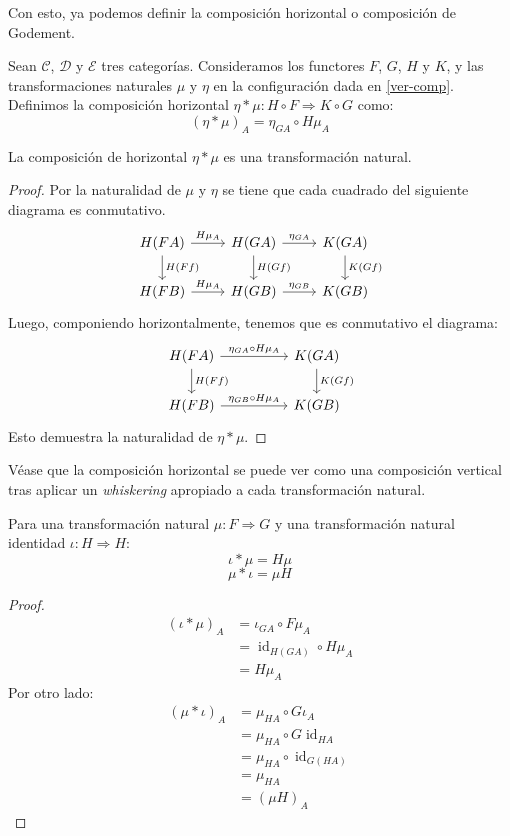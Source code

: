 \documentclass[12pt, twoside]{book}
\newcommand{\cat}{{\mathcal{C}}}
\DeclareMathOperator{\id}{id}
\begin{document}
Con esto, ya podemos definir la composición horizontal o composición de Godement.
\begin{definition}
Sean $\cat$, $\mathcal{D}$ y $\mathcal{E}$ tres categorías.
Consideramos los functores $F$, $G$, $H$ y $K$, y las transformaciones naturales $\mu$ y $\eta$ en la configuración dada en \ref{ver-comp}.
Definimos la composición horizontal $\eta * \mu \colon H \circ F \Rightarrow K \circ G$ como:
\[ (\eta * \mu)_A = \eta_{G A} \circ H\mu_A \]
\end{definition}
\begin{proposition}
La composición de horizontal $\eta * \mu$ es una transformación natural.
\end{proposition}
\begin{proof}
Por la naturalidad de $\mu$ y $\eta$ se tiene que cada cuadrado del siguiente diagrama es conmutativo.
\[\begin{tikzcd}
{H(F A)} \arrow[r,"H\mu_A"] \arrow[d,"H(F f)"] & {H(G A)} \arrow[r,"\eta_{G A}"] \arrow[d,"H(G f)"] & {K(G A)} \arrow[d,"K(G f)"]\\
{H(F B)} \arrow[r,"H\mu_A"] & {H(G B)} \arrow[r,"\eta_{G B}"] & {K(G B)}
\end{tikzcd}\]
Luego, componiendo horizontalmente, tenemos que es conmutativo el diagrama:
\[\begin{tikzcd}
{H(F A)} \arrow[rr,"\eta_{G A} \circ H\mu_A"] \arrow[d,"H(F f)"] & & {K(G A)} \arrow[d,"K(G f)"]\\
{H(F B)} \arrow[rr,"\eta_{G B} \circ H\mu_A"] & & {K(G B)}
\end{tikzcd}\]
Esto demuestra la naturalidad de $\eta * \mu$.
\end{proof}

Véase que la composición horizontal se puede ver como una composición vertical tras aplicar un \emph{whiskering} apropiado a cada transformación natural.

\begin{proposition}
Para una transformación natural $\mu \colon F \Rightarrow G$ y una transformación natural identidad $\iota \colon H \Rightarrow H$:
\[ \iota * \mu = H\mu \]
\[ \mu * \iota = \mu H\]
\end{proposition}
\begin{proof}
\begin{align*}
(\iota * \mu)_A & = \iota_{G A} \circ F\mu_A\\
& = \id_{H (G A)} \circ H\mu_A\\
& = H\mu_A
\end{align*}
Por otro lado:
\begin{align*}
(\mu * \iota)_A & = \mu_{H A} \circ G\iota_A\\
& = \mu_{H A} \circ G\id_{H A}\\
& = \mu_{H A} \circ \id_{G(H A)}\\
& = \mu_{H A}\\
& = (\mu H)_A
\end{align*}
\end{proof}
\end{document}
